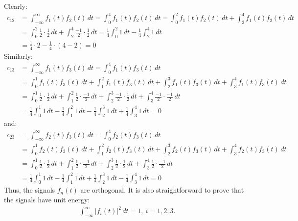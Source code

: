 \documentclass[a4paper,12pt]{article}
\begin{document}
\begin{enumerate}
        Clearly: 
        \begin{align*}
            c_{12} &= \int_{-\infty}^{\infty}f_1(t)f_2(t)\, dt=\int_{0}^{4}f_1(t)f_2(t)\, dt = \int_{0}^{2}f_1(t)f_2(t)\, dt+\int_{2}^{4}f_1(t)f_2(t)\, dt \\
            &= \int_{0}^{2}\frac{1}{2} \cdot \frac{1}{2}\, dt + \int_{2}^{4}\frac{-1}{2} \cdot \frac{1}{2}\, dt = \frac{1}{4}\int_{0}^{2}1\, dt-\frac{1}{4}\int_{2}^{4}1\, dt \\
            &= \frac{1}{4} \cdot 2-\frac{1}{4} \cdot (4-2) = 0 
        \end{align*}
        Similarly: 
        \begin{align*}
            c_{13} &= \int_{-\infty}^{\infty}f_1(t)f_3(t)\,dt = \int_{0}^{4}f_1(t)f_3(t)\, dt \\
            &= \int_{0}^{1}f_1(t)f_3(t)\, dt + \int_{1}^{2}f_1(t)f_3(t)\, dt + \int_{2}^{3}f_1(t)f_3(t)\, dt + \int_{3}^{4}f_1(t)f_3(t)\, dt \\
            &= \int_{0}^{1}\frac{1}{2} \cdot \frac{1}{2}\, dt + \int_{1}^{2}\frac{1}{2} \cdot \frac{-1}{2}\, dt + \int_{2}^{3}\frac{-1}{2} \cdot \frac{1}{2}\, dt + \int_{3}^{4}\frac{-1}{2} \cdot \frac{-1}{2}\, dt \\ 
            &=\frac{1}{4}\int_{0}^{1}1\, dt-\frac{1}{4}\int_{1}^{2}1\, dt-\frac{1}{4}\int_{2}^{3}1\, dt+\frac{1}{4}\int_{3}^{4}1\, dt=0
        \end{align*}
        and: 
        \begin{align*}
            c_{23} &= \int_{-\infty}^{\infty}f_2(t)f_3(t)\,dt=\int_{0}^{4}f_2(t)f_3(t)\, dt \\
            &= \int_{0}^{1}f_2(t)f_3(t)\, dt + \int_{1}^{2}f_2(t)f_3(t)\, dt + \int_{2}^{3}f_2(t)f_3(t)\, dt + \int_{3}^{4}f_2(t)f_3(t)\, dt \\
            &= \int_{0}^{1}\frac{1}{2} \cdot \frac{1}{2}\, dt + \int_{1}^{2}\frac{1}{2} \cdot \frac{-1}{2}\, dt + \int_{2}^{3}\frac{1}{2} \cdot \frac{1}{2}\, dt + \int_{3}^{4}\frac{1}{2} \cdot \frac{-1}{2}\, dt \\ 
            &= \frac{1}{4}\int_{0}^{1}1\, dt-\frac{1}{4}\int_{1}^{2}1\, dt 
             + \frac{1}{4}\int_{2}^{3}1\, dt-\frac{1}{4}\int_{3}^{4}1\, dt = 0
        \end{align*}
        Thus, the signals $f_n(t)$ are orthogonal. It is also straightforward to prove that the signals have unit energy:
        \begin{align*}
            \int_{-\infty}^{\infty} |f_i(t)|^2\, dt=1,\ i=1,2,3. 
        \end{align*}

\end{enumerate}
\end{document}
